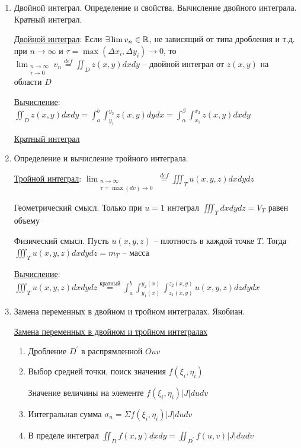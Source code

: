 \documentclass[12pt]{article}
\begin{document}
    \begin{enumerate}
        \item Двойной интеграл. Определение и свойства. Вычисление двойного интеграла. Кратный интеграл.

        \hyperlink{doubleintegral}{Двойной интеграл}: Если $\exists \lim v_n \in \mathbb{R}$, не зависящий от типа дробления и т.д. при $n \rightarrow \infty$ и
        $\tau = \max (\Delta x_i, \Delta y_i) \to 0$, то $\lim_{\substack{n\to\infty \\ \tau \to 0}} v_n \stackrel{def}{=} \iint_D z(x, y) dx dy$ -- двойной интеграл от $z(x, y)$ на области $D$

        \hyperlink{doubleintegralcalculation}{Вычисление}: $\iint_D z(x, y) dxdy = \int_a^b \int_{y_1}^{y_2} z(x, y) dydx = \int_\alpha^\beta \int_{x_1}^{x_2} z(x, y) dxdy$

        \hyperlink{multipleintegral}{Кратный интеграл}

        \item Определение и вычисление тройного интеграла.

        \hyperlink{tripleintegral}{Тройной интеграл}: $\lim_{\substack{n \to \infty \\ \tau = \max (dv) \to 0}} \stackrel{def}{=} \iiint_T u(x, y, z) dxdydz$

        Геометрический смысл. Только при $u = 1$ интеграл $\iiint_T dxdydz = V_T$ равен объему

        Физический смысл. Пусть $u(x, y, z)$ -- плотность в каждой точке $T$. Тогда $\iiint_T u(x, y, z) dxdydz = m_T$ -- масса

        \hyperlink{tripleintegralcalculation}{Вычисление}: $\iiint_T u(x, y, z) dxdydz \stackrel{\text{кратный}}{=} \int^b_a \int_{y_1(x)}^{y_2(x)} \int_{z_1(x, y)}^{z_2(x, y)} u(x, y, z) dz dy dx$


        \item Замена переменных в двойном и тройном интегралах. Якобиан.

        \hyperlink{substitutionindoubleintegral}{Замена переменных в двойном и тройном интегралах}

        \begin{enumerate}
            \item Дробление $D^\prime$ в распрямленной $Ouv$
            \item Выбор средней точки, поиск значения $f(\xi_i, \eta_i)$

            Значение величины на элементе $f(\xi_i, \eta_i) |J| du dv$
            \item Интегральная сумма $\sigma_n = \Sigma f(\xi_i, \eta_i) |J| du dv$
            \item В пределе интеграл $\iint_D f(x, y) dx dy = \iint_{D^\prime} f(u, v) |J| du dv$
        \end{enumerate}


\end{enumerate}
\end{document}
